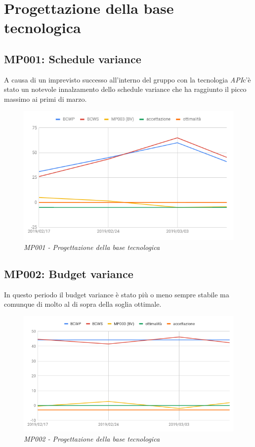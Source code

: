 \section{Progettazione della base tecnologica}
\label{progettazione}
\subsection{MP001: Schedule variance}
A causa di un imprevisto successo all'interno del gruppo con la tecnologia \textit{API}c'è stato un notevole innalzamento dello schedule variance che ha raggiunto il picco massimo ai primi di marzo.
\begin{figure} [h]
    \centering
	\includegraphics[scale=0.6]{./images/svP.png}
	\caption{\textit{MP001 - Progettazione della base tecnologica}}\label{}
\end{figure}
\pagebreak
\subsection{MP002: Budget variance}
In questo periodo il budget variance è stato più o meno sempre stabile ma comunque di molto al di sopra della soglia ottimale.
\begin{figure} [h]
    \centering
	\includegraphics[scale=0.5]{./images/bvP.png}
	\caption{\textit{MP002 - Progettazione della base tecnologica}}\label{}
\end{figure}

